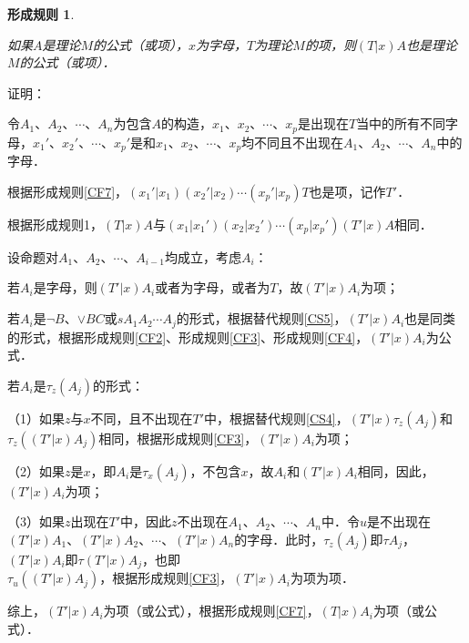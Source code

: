 \documentclass[12pt, a4paper, oneside]{book}
\newtheorem{CF}{形成规则}
\begin{document}
			\begin{CF}\label{CF8}
				\hfill\par
				如果$A$是理论$M$的公式（或项），$x$为字母，$T$为理论$M$的项，则$(T|x)A$也是理论$M$的公式（或项）．
			\end{CF}
			证明：
			\par
			令$A_1$、$A_2$、$\cdots$、$A_n$为包含$A$的构造，$x_1$、$x_2$、$\cdots$、$x_p$是出现在$T$当中的所有不同字母，$x_1'$、$x_2'$、$\cdots$、$x_p'$是和$x_1$、$x_2$、$\cdots$、$x_p$均不同且不出现在$A_1$、$A_2$、$\cdots$、$A_n$中的字母．
			\par
			根据形成规则\ref{CF7}，$(x_1'|x_1)(x_2'|x_2)\cdots(x_p'|x_p)T$也是项，记作$T'$．
			\par
			根据形成规则1，$(T|x)A$与$(x_1|x_1') (x_2|x_2')\cdots(x_p|x_p')(T'|x)A$相同．
			\par
			设命题对$A_1$、$A_2$、$\cdots$、$A_{i-1}$均成立，考虑$A_i$：
			\par
			若$A_i$是字母，则$(T'|x)A_i$或者为字母，或者为$T$，故$(T'|x)A_i$为项；
			\par
			若$A_i$是$\neg B$、$\lor BC$或$sA_1A_2\cdots A_j$的形式，根据替代规则\ref{CS5}，$(T'|x)A_i$也是同类的形式，根据形成规则\ref{CF2}、形成规则\ref{CF3}、形成规则\ref{CF4}，$(T'|x)A_i$为公式．
			\par
			若$A_i$是$\tau_z(A_j)$的形式：
			\par
			（1）如果$z$与$x$不同，且不出现在$T'$中，根据替代规则\ref{CS4}，$(T'|x)\tau_z(A_j)$和$\tau_z((T'|x)A_j)$相同，根据形成规则\ref{CF3}，$(T'|x)A_i$为项；
			\par
			（2）如果$z$是$x$，即$A_i$是$\tau_x(A_j)$，不包含$x$，故$A_i$和$(T'|x)A_i$相同，因此，$(T'|x)A_i$为项；
			\par
			（3）如果$z$出现在$T'$中，因此$z$不出现在$A_1$、$A_2$、$\cdots$、$A_n$中．令$u$是不出现在$(T'|x)A_1$、$(T'|x)A_2$、$\cdots$、$(T'|x)A_n$的字母．此时，$\tau_z(A_j)$即$\tau A_j$，$(T'|x)A_i$即$\tau(T'|x)A_j$，也即\\$\tau _u((T'|x)A_j)$，根据形成规则\ref{CF3}，$(T'|x)A_i$为项为项．
			\par
			综上，$(T'|x)A_i$为项（或公式），根据形成规则\ref{CF7}，$(T|x)A_i$为项（或公式）．
			
\end{document}

